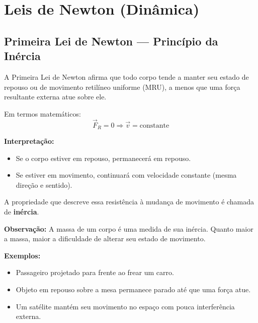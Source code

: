 \documentclass[a4paper,12pt]{article}
\begin{document}
\newpage

\section{Leis de Newton (Dinâmica)}

\subsection{Primeira Lei de Newton — Princípio da Inércia}

A Primeira Lei de Newton afirma que todo corpo tende a manter seu estado de repouso 
ou de movimento retilíneo uniforme (MRU), a menos que uma força resultante externa 
atue sobre ele.

\begin{center}
\end{center}


Em termos matemáticos:
\[
\vec{F}_R = 0 \Rightarrow \vec{v} = \text{constante}
\]

\textbf{Interpretação:}
\begin{itemize}
    \item Se o corpo estiver em repouso, permanecerá em repouso.
    \item Se estiver em movimento, continuará com velocidade constante (mesma direção e sentido).
\end{itemize}

A propriedade que descreve essa resistência à mudança de movimento é chamada de \textbf{inércia}.

\textbf{Observação:} A massa de um corpo é uma medida de sua inércia. Quanto maior a massa, maior a dificuldade de alterar seu estado de movimento.

\textbf{Exemplos:}
\begin{itemize}
    \item Passageiro projetado para frente ao frear um carro.
    \item Objeto em repouso sobre a mesa permanece parado até que uma força atue.
    \item Um satélite mantém seu movimento no espaço com pouca interferência externa.
\end{itemize}
\end{document}
